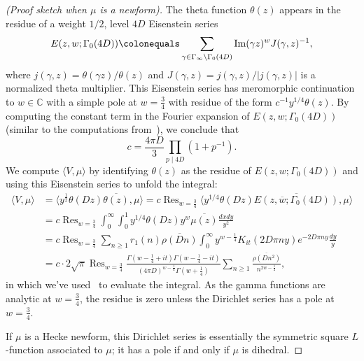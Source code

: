 \documentclass[11pt,reqno,oneside]{amsart}
\theoremstyle{plain}
\theoremstyle{definition}
\renewcommand{\Im}{\operatorname{Im}}
\DeclareMathOperator*{\Res}{Res}
\begin{document}
\begin{proof}[(Proof sketch when $\mu$ is a newform)]
  The theta function $\theta(z)$ appears in the residue of a weight $1/2$, level
  $4D$ Eisenstein series
  \[
    E(z,w; \Gamma_0(4D))
    \colonequals
    \sum_{\gamma \in \Gamma_{\infty} \backslash \Gamma_0(4D)} \Im(\gamma z)^w J(\gamma, z)^{-1},
  \]
  where $j(\gamma, z) = \theta(\gamma z) / \theta(z)$ and $J(\gamma, z) =
    j(\gamma, z) / | j(\gamma, z) |$ is a normalized theta multiplier.
  This Eisenstein series has meromorphic continuation to $w \in \mathbb{C}$ with a simple pole at $w=\frac{3}{4}$ with residue of the form $c^{-1} y^{1/4} \theta(z)$.
  By computing the constant term in the Fourier expansion of
  $E(z,w;\Gamma_0(4D))$ (similar to the computations
  from~\cite[\S3.1]{goldfeld2006automorphic}), we conclude that
  \[
    c = \frac{4 \pi D}{3} \prod_{p \mid 4D} (1 + p^{-1}).
  \]
  We compute $\langle V, \mu \rangle$ by identifying $\theta(z)$ as the
  residue of $E(z,w;\Gamma_0(4D))$ and using this Eisenstein series to unfold
  the integral:
  \begin{align}\label{eq:unfolding-theta-pre}
    \langle V, \mu \rangle
     & = \langle y^{\frac{1}{2}} \theta(Dz) \overline{\theta(z)}, \mu \rangle
    = c \Res_{w = \frac{3}{4}}
    \langle y^{1/4} \theta(Dz) \overline{E(z,\overline{w};\Gamma_0(4D))}, \mu \rangle    \\
     & = c \Res_{w = \frac{3}{4}} \int_{0}^{\infty} \int_{0}^{1}
    y^{1/4} \theta(Dz) y^{w} \overline{\mu(z)} \frac{dxdy}{y^2}                          \\
     & = c \Res_{w = \frac{3}{4}} \sum_{n \ge 1} r_1(n) \overline{\rho(Dn)}
    \int_0^{\infty} y^{w-\frac{1}{4}} K_{i t} (2D \pi n y) e^{-2 D \pi n y} \frac{dy}{y} \\
     & = c \cdot  2\sqrt{\pi} \Res_{w = \frac{3}{4}}
    \frac{\Gamma(w-\frac{1}{4}+it) \Gamma(w-\frac{1}{4} - i t)}
    {(4 \pi D)^{w-\frac{1}{4}} \Gamma(w + \frac{1}{4})}
    \sum_{n \ge 1} \frac{\overline{\rho(Dn^2)}}{n^{2w-\frac{1}{2}}},
  \end{align}
  in which we've used~\cite[6.621(3)]{GradshteynRyzhik07} to evaluate the integral.
  As the gamma functions are analytic at $w = \frac{3}{4}$, the residue is zero
  unless the Dirichlet series has a pole at $w=\frac{3}{4}$.

  If $\mu$ is a Hecke newform, this Dirichlet series is essentially the symmetric
  square $L$-function associated to $\mu$; it has a pole if and only if $\mu$
  is dihedral.
\end{proof}
\end{document}
